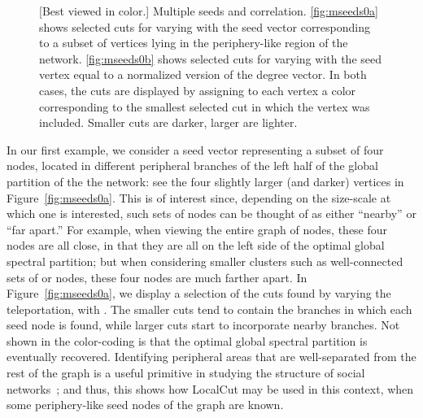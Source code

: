 \documentclass[11pt]{article}
\begin{document}
\begin{figure}[h] 
\caption{[Best viewed in color.]  
Multiple seeds and correlation.
\ref{fig:mseeds0a} shows selected cuts for varying  with the seed 
vector corresponding to a subset of  vertices lying in the periphery-like
region of the network. 
\ref{fig:mseeds0b} shows selected cuts for varying  with the seed 
vertex equal to a normalized version of the degree vector. 
In both cases, the cuts are displayed by assigning to each vertex a color 
corresponding to the smallest selected cut in which the vertex was included. 
Smaller cuts are darker, larger are lighter.  
}
\label{fig:mseeds0}
\end{figure}




In our first example, we consider a seed vector representing a subset of 
four nodes, located in different peripheral branches of the left half of 
the global partition of the the network: 
see the four slightly larger (and darker) vertices in Figure~\ref{fig:mseeds0a}.
This is of interest since, depending on the size-scale at which one is 
interested, such sets of nodes can be thought of as either ``nearby'' or ``far 
apart.''
For example, when viewing the entire graph of  nodes, these 
four nodes are all close, in that they are all on the left side of the 
optimal global spectral partition; but when considering smaller clusters 
such as well-connected sets of  or  nodes, these four nodes are 
much farther apart. 
In Figure~\ref{fig:mseeds0a}, we display a selection of the cuts found by 
varying the teleportation, with . 
The smaller cuts tend to contain the branches in which each seed node is 
found, while larger cuts start to incorporate nearby branches. 
Not shown in the color-coding is that the optimal global spectral 
partition is eventually recovered.
Identifying peripheral areas that are well-separated from the rest of the 
graph is a useful primitive in studying the structure of social 
networks~\cite{LLDM08_communities_CONF,LLDM09_communities_IM,LLM10_communities_CONF}; 
and thus, this shows how \textsf{LocalCut} may be used in this context, when 
some periphery-like seed nodes of the graph are known.
\end{document}
